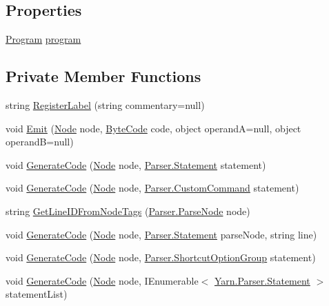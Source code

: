 \subsection*{Properties}
\begin{DoxyCompactItemize}
\item 
\hyperlink{a00126}{Program} \hyperlink{a00034_aa1737da428ec7d597009661dd8a47829}{program}
\end{DoxyCompactItemize}
\subsection*{Private Member Functions}
\begin{DoxyCompactItemize}
\item 
string \hyperlink{a00034_a1bae0d8b701a59708641aa36ea971fa5}{Register\-Label} (string commentary=null)
\item 
void \hyperlink{a00034_a774e8c143cdda0584fcfdda98626a83c}{Emit} (\hyperlink{a00031_dd/de2/a00320}{Node} node, \hyperlink{a00031_ad5dfb6ee68ca7469623ad3e459f98894}{Byte\-Code} code, object operand\-A=null, object operand\-B=null)
\item 
void \hyperlink{a00034_a006f3becd521cc179ba3d3352f6f930b}{Generate\-Code} (\hyperlink{a00031_dd/de2/a00320}{Node} node, \hyperlink{a00142}{Parser.\-Statement} statement)
\item 
void \hyperlink{a00034_a656b6c7fcd08d24300ec592465274f66}{Generate\-Code} (\hyperlink{a00031_dd/de2/a00320}{Node} node, \hyperlink{a00063}{Parser.\-Custom\-Command} statement)
\item 
string \hyperlink{a00034_a5117b9c2253de15d3fd3557c8b037235}{Get\-Line\-I\-D\-From\-Node\-Tags} (\hyperlink{a00122}{Parser.\-Parse\-Node} node)
\item 
void \hyperlink{a00034_af1ee28d67902b27ee0816e2a47343652}{Generate\-Code} (\hyperlink{a00031_dd/de2/a00320}{Node} node, \hyperlink{a00142}{Parser.\-Statement} parse\-Node, string line)
\item 
void \hyperlink{a00034_a3e492edcefdfeacec80e528f8c4fa6cc}{Generate\-Code} (\hyperlink{a00031_dd/de2/a00320}{Node} node, \hyperlink{a00136}{Parser.\-Shortcut\-Option\-Group} statement)
\item 
void \hyperlink{a00034_ab4f6dd2ddf38b0c5bfb2b8a40869a09a}{Generate\-Code} (\hyperlink{a00031_dd/de2/a00320}{Node} node, I\-Enumerable$<$ \hyperlink{a00142}{Yarn.\-Parser.\-Statement} $>$ statement\-List)
\item 

\end{DoxyCompactItemize}
